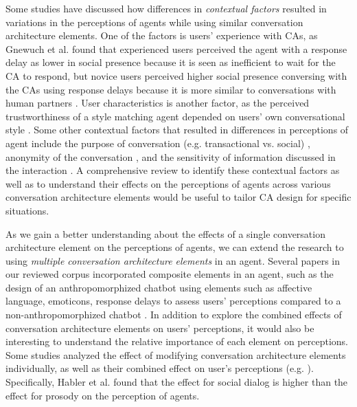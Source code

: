 Some studies have discussed how differences in \textit{contextual factors} resulted in variations in the perceptions of agents while using similar conversation architecture elements. One of the factors is users' experience with CAs, as Gnewuch et al. \cite{gnewuch2018faster}\cmt{[19]} found that experienced users perceived the agent with a response delay as lower in social presence because it is seen as inefficient to wait for the CA to respond, but novice users perceived higher social presence conversing with the CAs using response delays because it is more similar to conversations with human partners \cite{gnewuch2018faster}\cmt{[19]}. User characteristics is another factor, as the perceived trustworthiness of a style matching agent depended on users' own conversational style \cite{hoegen2019end}\cmt{[31]}. Some other contextual factors that resulted in differences in perceptions of agent include the purpose of conversation (e.g. transactional vs. social) \cite{jeong2019exploring}\cmt{[10]}, anonymity of the conversation \cite{lee2020hear}\cmt{[23]}, and the sensitivity of information discussed in the interaction \cite{cox2022does}\cmt{[27]}. A comprehensive review to identify these contextual factors as well as to understand their effects on the perceptions of agents across various conversation architecture elements would be useful to tailor CA design for specific situations. 

As we gain a better understanding about the effects of a single conversation architecture element on the perceptions of agents, we can extend the research to using \textit{multiple conversation architecture elements} in an agent. Several papers in our reviewed corpus incorporated composite elements in an agent, such as the design of an anthropomorphized chatbot using elements such as affective language, emoticons, response delays to assess users' perceptions compared to a non-anthropomorphized chatbot \cite{seeger2021chatbots}\cmt{[35]}. In addition to explore the combined effects of conversation architecture elements on users' perceptions, it would also be interesting to understand the relative importance of each element on perceptions. Some studies analyzed the effect of modifying conversation architecture elements individually, as well as their combined effect on user's perceptions (e.g. \cite{habler2019effects}\cmt{[63]}\cite{lubold2016effects}\cmt{[86]}\cite{zhu2022effects}\cmt{[26]}). Specifically, Habler et al. \cite{habler2019effects}\cmt{[63]} found that the effect for social dialog is higher than the effect for prosody on the perception of agents. 


